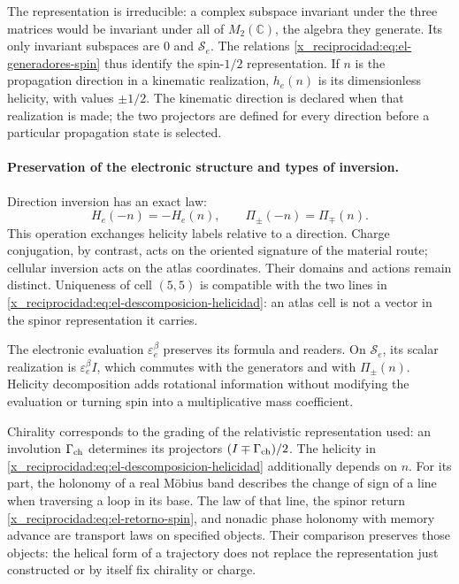 The representation is irreducible: a complex subspace invariant under
the three matrices would be invariant under all of \(M_2(\mathbb C)\), the
algebra they generate. Its only invariant subspaces are \(0\) and
\(\mathscr S_e\). The relations
\eqref{x_reciprocidad:eq:el-generadores-spin} thus identify the spin-\(1/2\)
representation. If \(n\) is the propagation direction in a
kinematic realization, \(h_e(n)\) is its dimensionless helicity, with
values \(\pm1/2\). The kinematic direction is declared when that
realization is made; the two projectors are defined for every direction
before a particular propagation state is selected.

\paragraph{Preservation of the electronic structure and types of inversion.}
Direction inversion has an exact law:
\[
 H_e(-n)=-H_e(n),\qquad \Pi_\pm(-n)=\Pi_\mp(n).
\]
This operation exchanges helicity labels relative to a
direction. Charge conjugation, by contrast, acts on the oriented
signature of the material route; cellular inversion acts on the
atlas coordinates. Their domains and actions remain distinct.
Uniqueness of cell \((5,5)\) is compatible with the two lines in
\eqref{x_reciprocidad:eq:el-descomposicion-helicidad}: an atlas cell is not a
vector in the spinor representation it carries.

The electronic evaluation \(\varepsilon_e^\beta\) preserves its
formula and readers. On \(\mathscr S_e\), its scalar realization
is \(\varepsilon_e^\beta I\), which commutes with the generators and with
\(\Pi_\pm(n)\). Helicity decomposition adds rotational
information without modifying the evaluation or turning spin into a
multiplicative mass coefficient.

Chirality corresponds to the grading of the relativistic representation
used: an involution \(\Gamma_{\rm ch}\) determines its
projectors \((I\mp\Gamma_{\rm ch})/2\). The helicity in
\eqref{x_reciprocidad:eq:el-descomposicion-helicidad} additionally depends on \(n\).
For its part, the holonomy of a real Möbius band describes the change
of sign of a line when traversing a loop in its base. The law of that line,
the spinor return \eqref{x_reciprocidad:eq:el-retorno-spin}, and nonadic phase holonomy
with memory advance are transport laws on specified
objects. Their comparison preserves those objects: the helical form
of a trajectory does not replace the representation just
constructed or by itself fix chirality or charge.

